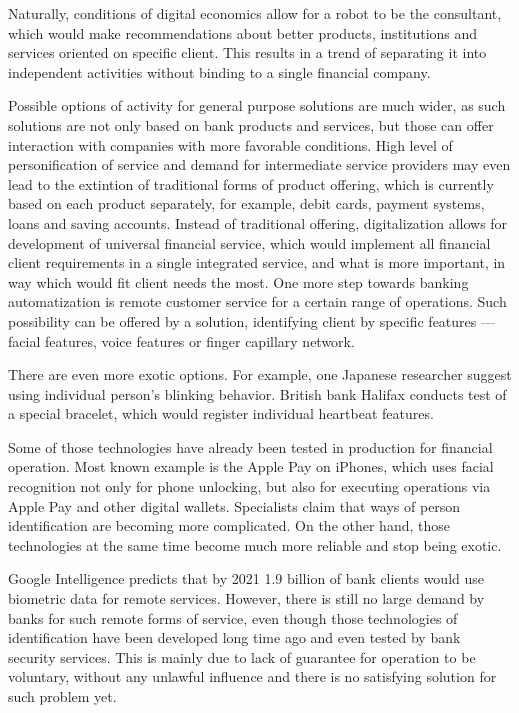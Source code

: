 Naturally, conditions of digital economics allow for a robot to be the consultant, which would make recommendations about better products, institutions and services oriented on specific client.
This results in a trend of separating it into independent activities without binding to a single financial company.

Possible options of activity for general purpose solutions are much wider, as such solutions are not only based on bank products and services, but those can offer interaction with companies with more favorable conditions.
High level of personification of service and demand for intermediate service providers may even lead to the extintion of traditional forms of product offering, which is currently based on each product separately, for example, debit cards, payment systems, loans and saving accounts.
Instead of traditional offering, digitalization allows for development of universal financial service, which would implement all financial client requirements in a single integrated service, and what is more important, in way which would fit client needs the most.
One more step towards banking automatization is remote customer service for a certain range of operations.
Such possibility can be offered by a solution, identifying client by specific features — facial features, voice features or finger capillary network.

There are even more exotic options. 
For example, one Japanese researcher suggest using individual person's blinking behavior.
British bank Halifax conducts test of a special bracelet, which would register individual heartbeat features.
\cite{ways_ai_transforming_bi}

Some of those technologies have already been tested in production for financial operation. Most known example is the Apple Pay on iPhones, which uses facial recognition not only for phone unlocking, but also for executing operations via Apple Pay and other digital wallets.
Specialists claim that ways of person identification are becoming more complicated. 
On the other hand, those technologies at the same time become much more reliable and stop being exotic.

Google Intelligence predicts that by 2021 1.9 billion of bank clients would use biometric data for remote services.
However, there is still no large demand by banks for such remote forms of service, even though those technologies of identification have been developed long time ago and even tested by bank security services.
This is mainly due to lack of guarantee for operation to be voluntary, without any unlawful influence and there is no satisfying solution for such problem yet.
